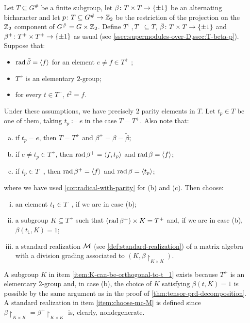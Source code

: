 \begin{defi}\label{def:std-realization-MxM-QxQ}
    Let $T \subseteq G^\#$ be a finite subgroup, let $\beta\colon T\times T \to \{ \pm 1 \}$ be an alternating bicharacter and let $p\colon T \subseteq G^\# \to \mathbb{Z}_2$ be the restriction of the projection on the $\mathbb{Z}_2$ component of $G^\# = G \times \mathbb{Z}_2$. 
    Define $T^+, T^- \subseteq T$, $\tilde\beta\colon T\times T \to \{ \pm 1 \}$ and $\beta^+\colon T^+\times T^+ \to \{ \pm 1 \}$ as usual (see \cref{ssec:supermodules-over-D,ssec:T-beta-p}).
    Suppose that:
    \begin{itemize}
        \item $\operatorname{rad} \tilde \beta = \langle f \rangle$ for an element $e \neq f\in T^+$ ;
        \item $T^+$ is an elementary $2$-group;
        \item for every $t\in T^-$, $t^2 = f$.
    \end{itemize}
    Under these assumptions, we have precisely $2$ parity elements in $T$. 
    Let $t_p \in T$ be one of them, taking $t_p \coloneqq e$ in the case $T = T^+$. 
    Also note that:
    \begin{enumerate}[(a)]
        \item if $t_p =e$, then $T = T^+$ and $\beta^+ = \beta = \tilde\beta$;
        \item if $e \neq t_p \in T^+$, then $\operatorname{rad} \beta^+ = \langle f, t_p \rangle$ and $\operatorname{rad} \beta = \langle f \rangle$;
        \item if $t_p \in T^-$, then $\operatorname{rad} \beta^+ = \langle f \rangle$ and $\operatorname{rad} \beta = \langle t_p \rangle$;
    \end{enumerate}
    where we have used \cref{cor:radical-with-parity} for (b) and (c).
    Then choose:
    \begin{enumerate}[(i)]
        \item an element $t_1 \in T^-$, if we are in case (b);
        \label{item:choose-t_1-std-realization}
        \item a subgroup $K \subseteq T^+$ such that $(\operatorname{rad} \beta^+) \times K = T^+$ and, if we are in case (b), $\beta(t_1, K) = 1$;
        \label{item:K-can-be-orthogonal-to-t_1}
        \item a standard realization $\mathcal M$ (see     \cref{def:standard-realization}) of a matrix algebra with a division grading  associated to $(K, \beta\restriction_{K\times K})$. 
        \label{item:choose-mc-M}
    \end{enumerate}
    A subgroup $K$ in item \eqref{item:K-can-be-orthogonal-to-t_1} exists because $T^+$ is an elementary $2$-group and, in case (b), the choice of $K$ satisfying $\beta(t, K) = 1$ is possible by the same argument as in the proof of \cref{thm:tensor-prd-decomposition}. 
    A standard realization in item \eqref{item:choose-mc-M} is defined since $\beta\restriction_{K\times K} = \beta^+\restriction_{K\times K}$ is, clearly, nondegenerate. 
    

\end{defi}
